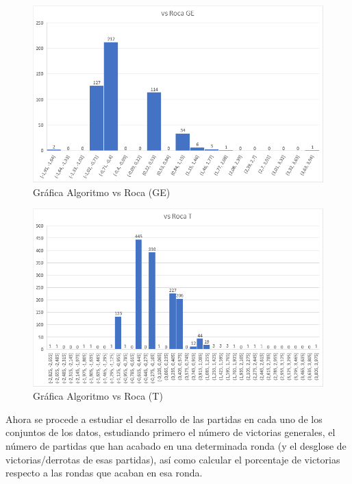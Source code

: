 \begin{figure}[h]
\centering
\includegraphics[width=.6\textwidth]{figuras/AvRGE.png}   
\caption{Gráfica Algoritmo vs Roca (GE)}
\label{fig:AvRGE}
\end{figure}

\begin{figure}[h]
\centering
\includegraphics[width=.6\textwidth]{figuras/AvRT.png}   
\caption{Gráfica Algoritmo vs Roca (T)}
\label{fig:AvRGT}
\end{figure}

Ahora se procede a estudiar el desarrollo de las partidas en cada uno de los conjuntos de los datos, estudiando primero el número de victorias generales, el número de partidas que han acabado en una determinada ronda (y el desglose de victorias/derrotas de esas partidas), así como calcular el porcentaje de victorias respecto a las rondas que acaban en esa ronda.


